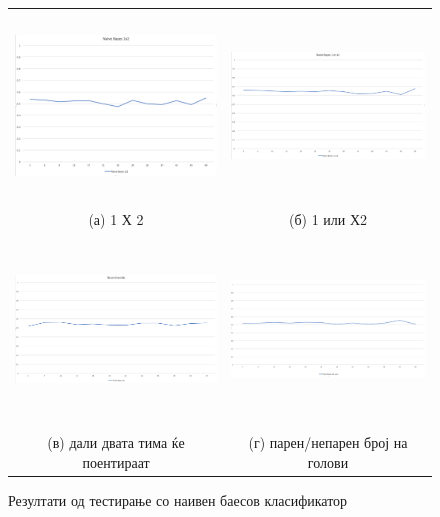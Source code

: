 \begin{figure}[H]
\centering
\begin{tabular}{cc}
  \includegraphics[width=8cm,height=5cm]{images/naive_bayes_1x2.png} &   
  \includegraphics[width=8cm,height=5cm]{images/naive_bayes_1_or_x2.png} \\
(а) 1 Х 2 & (б) 1 или Х2 \\
 \includegraphics[width=8cm,height=5cm]{images/naive_bayes_bts.png}
 &   
 \includegraphics[width=8cm,height=5cm]{images/naive_bayes_odd_even.png} \\
(в) дали двата тима ќе поентираат & (г) парен/непарен број на голови \\
\end{tabular}
\caption{Резултати од тестирање со наивен баесов класификатор}
\label{fig:naive_bayes}
\end{figure}

